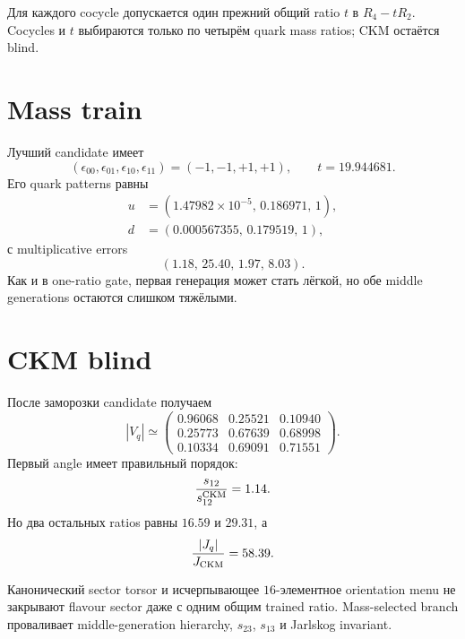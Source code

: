Для каждого cocycle допускается один прежний общий ratio \(t\) в
\(R_4-tR_2\). Cocycles и \(t\) выбираются только по четырём quark mass ratios;
CKM остаётся blind.

\section{Mass train}

Лучший candidate имеет
\begin{equation}
 (\epsilon_{00},\epsilon_{01},\epsilon_{10},\epsilon_{11})
 =(-1,-1,+1,+1),
 \qquad
 t=19.944681.
\end{equation}
Его quark patterns равны
\begin{align}
 u&=(1.47982\times10^{-5},\,0.186971,\,1),\\
 d&=(0.000567355,\,0.179519,\,1),
\end{align}
с multiplicative errors
\begin{equation}
 (1.18,\,25.40,\,1.97,\,8.03).
\end{equation}
Как и в one-ratio gate, первая генерация может стать лёгкой, но обе middle
generations остаются слишком тяжёлыми.

\section{CKM blind}

После заморозки candidate получаем
\begin{equation}
 |V_q|\simeq
 \begin{pmatrix}
 0.96068&0.25521&0.10940\\
 0.25773&0.67639&0.68998\\
 0.10334&0.69091&0.71551
 \end{pmatrix}.
\end{equation}
Первый angle имеет правильный порядок:
\begin{equation}
 \frac{s_{12}}{s_{12}^{\rm CKM}}=1.14.
\end{equation}
Но два остальных ratios равны \(16.59\) и \(29.31\), а
\begin{equation}
 \frac{|J_q|}{J_{\rm CKM}}=58.39.
\end{equation}

\begin{theorem}
Канонический sector torsor и исчерпывающее \(16\)-элементное orientation menu
не закрывают flavour sector даже с одним общим trained ratio. Mass-selected
branch проваливает middle-generation hierarchy, \(s_{23}\), \(s_{13}\) и
Jarlskog invariant.
\end{theorem}


